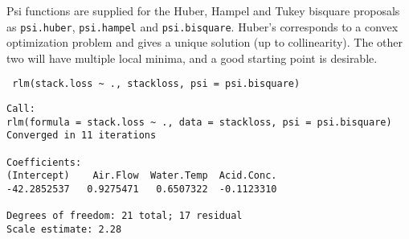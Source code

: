 \documentclass[residuals.tex]{subfiles}
\begin{document}
Psi functions are supplied for the Huber, Hampel and Tukey bisquare proposals as \texttt{psi.huber}, \texttt{psi.hampel} and \texttt{psi.bisquare}. Huber's corresponds to a convex optimization problem and gives a unique solution (up to collinearity). The other two will have multiple local minima, and a good starting point is desirable.





\begin{framed}
\begin{verbatim}
 rlm(stack.loss ~ ., stackloss, psi = psi.bisquare)
\end{verbatim}
\end{framed}
\begin{verbatim}
Call:
rlm(formula = stack.loss ~ ., data = stackloss, psi = psi.bisquare)
Converged in 11 iterations

Coefficients:
(Intercept)    Air.Flow  Water.Temp  Acid.Conc. 
-42.2852537   0.9275471   0.6507322  -0.1123310 

Degrees of freedom: 21 total; 17 residual
Scale estimate: 2.28 
\end{verbatim}

\newpage
\end{document}
